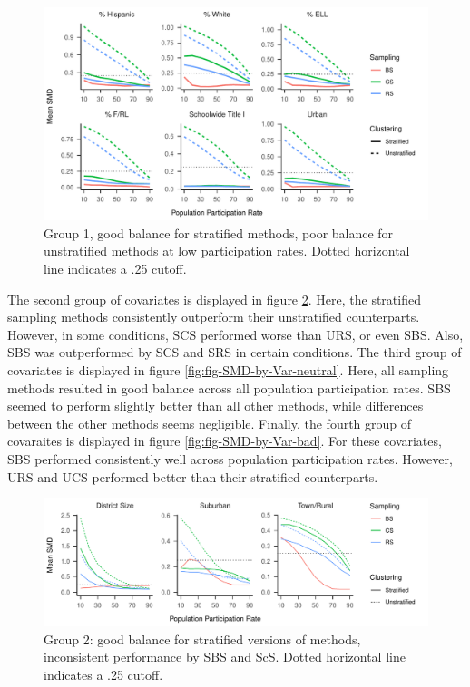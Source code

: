 \documentclass[man,floatsintext]{apa6}
\begin{document}
\begin{figure}
\centering
\includegraphics{GenSamp-Paper_files/figure-latex/fig-SMD-by-Var-good1-1.pdf}
\caption{\label{fig:fig-SMD-by-Var-good1}Group 1, good balance for stratified methods, poor balance for unstratified methods at low participation rates. Dotted horizontal line indicates a .25 cutoff.}
\end{figure}

The second group of covariates is displayed in figure \ref{fig:fig-SMD-by-Var-good2}. Here, the stratified sampling methods consistently outperform their unstratified counterparts. However, in some conditions, SCS performed worse than URS, or even SBS. Also, SBS was outperformed by SCS and SRS in certain conditions. The third group of covariates is displayed in figure \ref{fig:fig-SMD-by-Var-neutral}. Here, all sampling methods resulted in good balance across all population participation rates. SBS seemed to perform slightly better than all other methods, while differences between the other methods seems negligible. Finally, the fourth group of covaraites is displayed in figure \ref{fig:fig-SMD-by-Var-bad}. For these covariates, SBS performed consistently well across population participation rates. However, URS and UCS performed better than their stratified counterparts.

\begin{figure}
\centering
\includegraphics{GenSamp-Paper_files/figure-latex/fig-SMD-by-Var-good2-1.pdf}
\caption{\label{fig:fig-SMD-by-Var-good2}Group 2: good balance for stratified versions of methods, inconsistent performance by SBS and ScS. Dotted horizontal line indicates a .25 cutoff.}
\end{figure}
\end{document}
